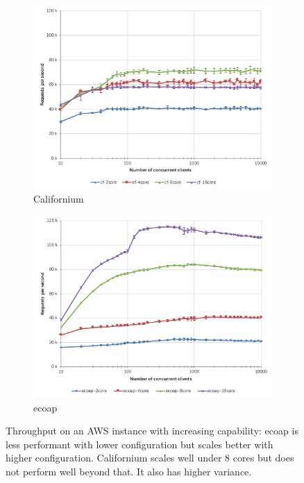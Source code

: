 \begin{figure}[!htbp]
\centering
\begin{subfigure}{0.75\textwidth}
\includegraphics[width=\linewidth]{cf_vertical_throughput}
\caption{Californium}
\end{subfigure}
\begin{subfigure}{0.75\textwidth}
\includegraphics[width=\linewidth]{ecoap_vertical_throughput}
\caption{ecoap}
\end{subfigure}
\caption[Throughput on an AWS instance with increasing capability]{Throughput on an AWS instance with increasing capability: ecoap is less performant with lower configuration but scales better with higher configuration. Californium scales well under 8 cores but does not perform well beyond that. It also has higher variance.}
\label{fig:vertical_throughput}
\end{figure}

